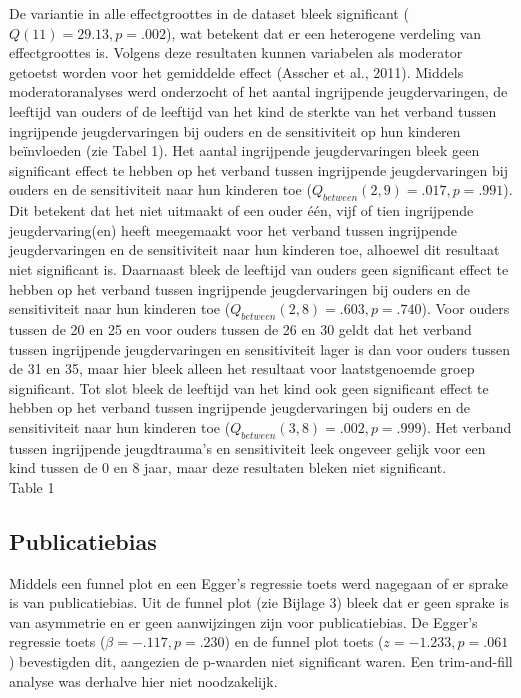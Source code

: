 \documentclass[12pt]{article}
\begin{document}
De variantie in alle effectgroottes in de dataset bleek significant
(\(Q (11) = 29.13, p = .002\)), wat betekent dat er een heterogene
verdeling van effectgroottes is. Volgens deze resultaten kunnen
variabelen als moderator getoetst worden voor het gemiddelde effect
(Asscher et al., 2011). Middels moderatoranalyses werd onderzocht of het
aantal ingrijpende jeugdervaringen, de leeftijd van ouders of de
leeftijd van het kind de sterkte van het verband tussen ingrijpende
jeugdervaringen bij ouders en de sensitiviteit op hun kinderen
beïnvloeden (zie Tabel 1). Het aantal ingrijpende jeugdervaringen bleek
geen significant effect te hebben op het verband tussen ingrijpende
jeugdervaringen bij ouders en de sensitiviteit naar hun kinderen toe
(\(Q_{between} (2,9) = .017, p = .991\)). Dit betekent dat het niet
uitmaakt of een ouder één, vijf of tien ingrijpende jeugdervaring(en)
heeft meegemaakt voor het verband tussen ingrijpende jeugdervaringen en
de sensitiviteit naar hun kinderen toe, alhoewel dit resultaat niet
significant is. Daarnaast bleek de leeftijd van ouders geen significant
effect te hebben op het verband tussen ingrijpende jeugdervaringen bij
ouders en de sensitiviteit naar hun kinderen toe
(\(Q_{between} (2,8) = .603, p = .740\)). Voor ouders tussen de 20 en 25
en voor ouders tussen de 26 en 30 geldt dat het verband tussen
ingrijpende jeugdervaringen en sensitiviteit lager is dan voor ouders
tussen de 31 en 35, maar hier bleek alleen het resultaat voor
laatstgenoemde groep significant. Tot slot bleek de leeftijd van het
kind ook geen significant effect te hebben op het verband tussen
ingrijpende jeugdervaringen bij ouders en de sensitiviteit naar hun
kinderen toe (\(Q_{between} (3,8) = .002, p = .999\)). Het verband
tussen ingrijpende jeugdtrauma's en sensitiviteit leek ongeveer gelijk
voor een kind tussen de 0 en 8 jaar, maar deze resultaten bleken niet
significant.\\
Table 1

\subsection{Publicatiebias}\label{publicatiebias-1}

Middels een funnel plot en een Egger's regressie toets werd nagegaan of
er sprake is van publicatiebias. Uit de funnel plot (zie Bijlage 3)
bleek dat er geen sprake is van asymmetrie en er geen aanwijzingen zijn
voor publicatiebias. De Egger's regressie toets
(\(\beta= -.117, p = .230\)) en de funnel plot toets
(\(z = -1.233, p = .061\)) bevestigden dit, aangezien de p-waarden niet
significant waren. Een trim-and-fill analyse was derhalve hier niet
noodzakelijk.
\end{document}
